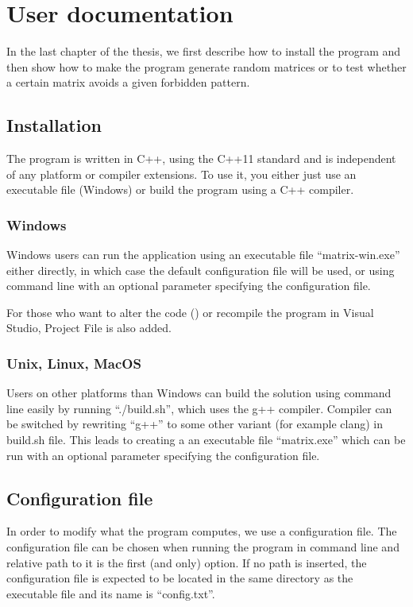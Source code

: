 \chapter{User documentation}
\label{chap:udoc}
In the last chapter of the thesis, we first describe how to install the program and then show how to make the program generate random matrices or to test whether a certain matrix avoids a given forbidden pattern.

\section{Installation}
The program is written in C++, using the C++11 standard and is independent of any platform or compiler extensions. To use it, you either just use an executable file (Windows) or build the program using a C++ compiler.

\subsection{Windows}
Windows users can run the application using an executable file ``matrix-win.exe'' either directly, in which case the default configuration file will be used, or using command line with an optional parameter specifying the configuration file.

For those who want to alter the code (\cite{program}) or recompile the program in Visual Studio, Project File is also added.

\subsection{Unix, Linux, MacOS}
Users on other platforms than Windows can build the solution using command line easily by running ``./build.sh'', which uses the g++ compiler. Compiler can be switched by rewriting ``g++'' to some other variant (for example clang) in build.sh file. This leads to creating a an executable file ``matrix.exe'' which can be run with an optional parameter specifying the configuration file.

\section{Configuration file}
In order to modify what the program computes, we use a configuration file. The configuration file can be chosen when running the program in command line and relative path to it is the first (and only) option. If no path is inserted, the configuration file is expected to be located in the same directory as the executable file and its name is ``config.txt''.

